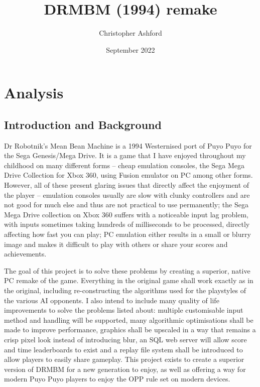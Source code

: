 \documentclass{article}
\title{DRMBM (1994) remake}
\author{Christopher Ashford}
\date{September 2022}
\begin{document}
\maketitle

\tableofcontents

\section{Analysis}

\subsection{Introduction and Background}

Dr Robotnik’s Mean Bean Machine is a 1994 Westernised port of Puyo Puyo for the Sega Genesis/Mega Drive. It is a game that I have enjoyed throughout my childhood on many different forms – cheap emulation consoles, the Sega Mega Drive Collection for Xbox 360, using Fusion emulator on PC among other forms. However, all of these present glaring issues that directly affect the enjoyment of the player – emulation consoles usually are slow with clunky controllers and are not good for much else and thus are not practical to use permanently; the Sega Mega Drive collection on Xbox 360 suffers with a noticeable input lag problem, with inputs sometimes taking hundreds of milliseconds to be processed, directly affecting how fast you can play; PC emulation either results in a small or blurry image and makes it difficult to play with others or share your scores and achievements.

The goal of this project is to solve these problems by creating a superior, native PC remake of the game. Everything in the original game shall work exactly as in the original, including re-constructing the algorithms used for the playstyles of the various AI opponents. I also intend to include many quality of life improvements to solve the problems listed about: multiple customisable input method and handling will be supported, many algorithmic optimisations shall be made to improve performance, graphics shall be upscaled in a way that remains a crisp pixel look instead of introducing blur, an SQL web server will allow score and time leaderboards to exist and a replay file system shall be introduced to allow players to easily share gameplay. This project exists to create a superior version of DRMBM for a new generation to enjoy, as well as offering a way for modern Puyo Puyo players to enjoy the OPP rule set on modern devices.
\end{document}
